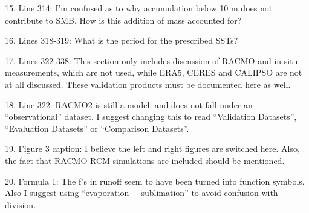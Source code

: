 \documentclass[12pt,oneside,a4paper]{article}%
\begin{document}
{\color{blue}{6.5K/km. I'd refer to reviewer to the Sellevold et al paper referenced, for more details on the choice of lapse rate.}} \newline

15. Line 314: I’m confused as to why accumulation below 10 m does not contribute to SMB. How is this addition of mass accounted for? \newline

{\color{blue}{The internally computed SMB is a bit strange, in that only tracks ice. It does not consider the overlying 10m of snow to contribute to the SMB. In response to the other reviewer, we've clarified this in sections 2.5.}} \newline

16. Lines 318-319: What is the period for the prescribed SSTs? \newline

{\color{blue}{Perpetual 1979. Added this in parantheses.}} \newline

17. Lines 322-338: This section only includes discussion of RACMO and in-situ measurements, which are not used, while ERA5, CERES and CALIPSO are not at all discussed. These validation products must be documented here as well. \newline

{\color{blue}{Fixed.}} \newline

18. Line 322: RACMO2 is still a model, and does not fall under an “observational” dataset. I suggest changing this to read “Validation Datasets”, “Evaluation Datasets” or “Comparison Datasets”. \newline

{\color{blue}{Changed to validation dataset throughout the manuscript.}} \newline

19. Figure 3 caption: I believe the left and right figures are switched here. Also, the fact that RACMO RCM simulations are included should be mentioned. \newline

{\color{blue}{Fixed, and included references to the RACMO grids in the text and figure caption.}} \newline

20. Formula 1: The f’s in runoff seem to have been turned into function symbols. Also I suggest using “evaporation + sublimation” to avoid confusion with division. \newline
\end{document}
